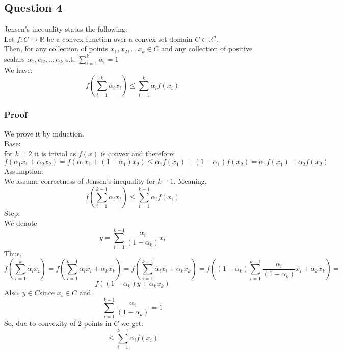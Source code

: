 \documentclass{article}
\begin{document}
\subsection{Question 4}
Jensen's inequality states the following:\\
Let $f:C \rightarrow \mathbb{R}$ be a convex function over a convex set domain $C \in \mathbb{R}^n$.\\
Then, for any collection of points $x_1,x_2,..,x_k \in C$ and any collection of positive scalars $\alpha_1,\alpha_2,..,\alpha_k$ s.t. $\sum_{i=1}^k \alpha_i = 1$\\
We have:
$$f(\sum_{i=1}^k \alpha_i x_i) \leq \sum_{i=1}^k \alpha_i f(x_i)$$
\subsubsection*{Proof}
We prove it by induction.\\
Base:\\
for $k=2$ it is trivial as $f(x)$ is convex and therefore:
$$f(\alpha_1 x_1 + \alpha_2 x_2) = f(\alpha_1 x_1 + (1-\alpha_1) x_2) \leq \alpha_1 f(x_1) + (1-\alpha_1) f(x_2) = \alpha_1 f(x_1) + \alpha_2 f(x_2)$$
Assumption:\\
We assume correctness of Jensen's inequality for $k-1$. Meaning,
$$f(\sum_{i=1}^{k-1} \alpha_i x_i) \leq \sum_{i=1}^{k-1} \alpha_i f(x_i)$$
Step:\\
We denote $$y=\sum_{i=1}^{k-1} \frac{\alpha_i}{(1-\alpha_k)} x_i$$ Thus,
$$f(\sum_{i=1}^{k} \alpha_i x_i) = f(\sum_{i=1}^{k-1} \alpha_i x_i + \alpha_k x_k) = f(\sum_{i=1}^{k-1} \alpha_i x_i + \alpha_k x_k) = f((1-\alpha_k)\sum_{i=1}^{k-1} \frac{\alpha_i}{(1-\alpha_k)} x_i + \alpha_k x_k) =$$
$$f((1-\alpha_k)y + \alpha_k x_k)$$
Also, $y\in C$since $x_i \in C$ and
$$\sum_{i=1}^{k-1} \frac{\alpha_i}{(1-\alpha_k)}=1$$
So, due to convexity of 2 points in $C$ we get:
$$\leq \sum_{i=1}^{k-1} \alpha_i f(x_i)$$
\end{document}
